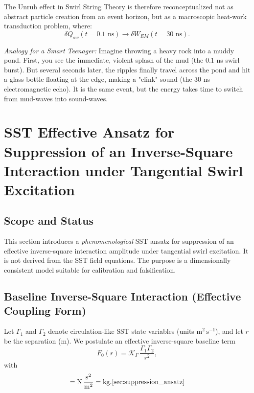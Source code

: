 \documentclass[11pt, a4paper]{article}
\begin{document}
        The Unruh effect in Swirl String Theory is therefore reconceptualized not as abstract particle creation from an event horizon, but as a macroscopic heat-work transduction problem, where:
        \begin{equation}
            \delta Q_{sw}(t=0.1\text{ ns}) \longrightarrow \delta W_{EM}(t=30\text{ ns}).
        \end{equation}
        
        \emph{Analogy for a Smart Teenager:} Imagine throwing a heavy rock into a muddy pond. First, you see the immediate, violent splash of the mud (the 0.1 ns swirl burst). But several seconds later, the ripples finally travel across the pond and hit a glass bottle floating at the edge, making a "clink" sound (the 30 ns electromagnetic echo). It is the same event, but the energy takes time to switch from mud-waves into sound-waves.

        \section{SST Effective Ansatz for Suppression of an Inverse-Square Interaction under Tangential Swirl Excitation}
        \label{sec:suppression_ansatz}
        
        \subsection{Scope and Status}
            This section introduces a \emph{phenomenological} SST ansatz for suppression of an effective inverse-square interaction amplitude under tangential swirl excitation.
            It is not derived from the SST field equations. The purpose is a dimensionally consistent model suitable for calibration and falsification.
        
        \subsection{Baseline Inverse-Square Interaction (Effective Coupling Form)}
            Let $\Gamma_{1}$ and $\Gamma_{2}$ denote circulation-like SST state variables (units $\mathrm{m^2\,s^{-1}}$), and let $r$ be the separation (m).
            We postulate an effective inverse-square baseline term
            \begin{equation}
                F_0(r) = \mathcal{K}_{\Gamma}\,\frac{\Gamma_1\Gamma_2}{r^2},
                \label{eq:F0}
            \end{equation}
            with
            \begin{equation}
                [\mathcal{K}_{\Gamma}] = \mathrm{N}\,\frac{\mathrm{s^2}}{\mathrm{m^2}} = \mathrm{kg}.
                \label{eq:KGamma_units}\ref{sec:suppression_ansatz}
            \end{equation}
        
\end{document}
